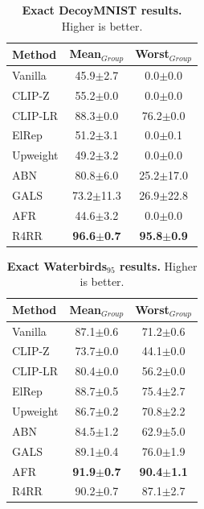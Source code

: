 \documentclass[10pt,twocolumn,letterpaper]{article}
\begin{document}
\begin{table}[h]
\centering
\caption{\textbf{Exact DecoyMNIST results.} Higher is better.}
\label{tab:supp_exact_decoymnist}
\small
\setlength{\tabcolsep}{8pt}
\renewcommand{\arraystretch}{1.12}
\begin{tabular}{lcc}
\toprule
\textbf{Method} & \textbf{Mean$_{Group}$} & \textbf{Worst$_{Group}$} \\
\midrule
Vanilla & 45.9{\scriptsize$\pm$2.7} & 0.0{\scriptsize$\pm$0.0} \\
CLIP-Z & 55.2{\scriptsize$\pm$0.0} & 0.0{\scriptsize$\pm$0.0} \\
CLIP-LR & 88.3{\scriptsize$\pm$0.0} & 76.2{\scriptsize$\pm$0.0} \\
ElRep & 51.2{\scriptsize$\pm$3.1} & 0.0{\scriptsize$\pm$0.1} \\
Upweight & 49.2{\scriptsize$\pm$3.2} & 0.0{\scriptsize$\pm$0.0} \\
ABN & 80.8{\scriptsize$\pm$6.0} & 25.2{\scriptsize$\pm$17.0} \\
GALS & 73.2{\scriptsize$\pm$11.3} & 26.9{\scriptsize$\pm$22.8} \\
AFR & 44.6{\scriptsize$\pm$3.2} & 0.0{\scriptsize$\pm$0.0} \\
R4RR & \textbf{96.6{\scriptsize$\pm$0.7}} & \textbf{95.8{\scriptsize$\pm$0.9}} \\
\bottomrule
\end{tabular}
\end{table}

\begin{table}[h]
\centering
\caption{\textbf{Exact Waterbirds$_{95}$ results.} Higher is better.}
\label{tab:supp_exact_waterbirds95}
\small
\setlength{\tabcolsep}{8pt}
\renewcommand{\arraystretch}{1.12}
\begin{tabular}{lcc}
\toprule
\textbf{Method} & \textbf{Mean$_{Group}$} & \textbf{Worst$_{Group}$} \\
\midrule
Vanilla & 87.1{\scriptsize$\pm$0.6} & 71.2{\scriptsize$\pm$0.6} \\
CLIP-Z & 73.7{\scriptsize$\pm$0.0} & 44.1{\scriptsize$\pm$0.0} \\
CLIP-LR & 80.4{\scriptsize$\pm$0.0} & 56.2{\scriptsize$\pm$0.0} \\
ElRep & 88.7{\scriptsize$\pm$0.5} & 75.4{\scriptsize$\pm$2.7} \\
Upweight & 86.7{\scriptsize$\pm$0.2} & 70.8{\scriptsize$\pm$2.2} \\
ABN & 84.5{\scriptsize$\pm$1.2} & 62.9{\scriptsize$\pm$5.0} \\
GALS & 89.1{\scriptsize$\pm$0.4} & 76.0{\scriptsize$\pm$1.9} \\
AFR & \textbf{91.9{\scriptsize$\pm$0.7}} & \textbf{90.4{\scriptsize$\pm$1.1}} \\
R4RR & 90.2{\scriptsize$\pm$0.7} & 87.1{\scriptsize$\pm$2.7} \\
\bottomrule
\end{tabular}
\end{table}
\end{document}
